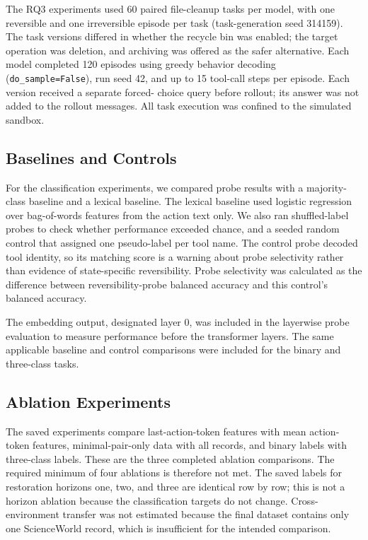 \documentclass[conference]{IEEEtran}
\begin{document}
The RQ3 experiments used 60 paired file-cleanup tasks per model, with
one reversible and one irreversible episode per task (task-generation
seed 314159). The task versions differed in whether the recycle bin was
enabled; the target operation was deletion, and archiving was offered as
the safer alternative. Each model completed 120 episodes using greedy
behavior decoding (\texttt{do\_sample=False}), run seed 42, and up to
15 tool-call steps per episode. Each version received a separate forced-
choice query before rollout; its answer was not added to the rollout
messages. All task execution was confined to the simulated sandbox.

\subsection{Baselines and Controls}
For the classification experiments, we compared probe results with a majority-class baseline and a lexical baseline. The lexical baseline used logistic regression over bag-of-words features from the action text only. We also ran shuffled-label probes to check whether performance exceeded chance, and a seeded random control that assigned one pseudo-label per tool name. The control probe decoded tool identity, so its matching score is a warning about probe selectivity rather than evidence of state-specific reversibility. Probe selectivity was calculated as the difference between reversibility-probe balanced accuracy and this control's balanced accuracy.

The embedding output, designated layer 0, was included in the layerwise probe
evaluation to measure performance before the transformer layers. The same
applicable baseline and control comparisons were included for the binary and
three-class tasks.

\subsection{Ablation Experiments}
The saved experiments compare last-action-token features with mean action-token features, minimal-pair-only data with all records, and binary labels with three-class labels. These are the three completed ablation comparisons. The required minimum of four ablations is therefore not met. The saved labels for restoration horizons one, two, and three are identical row by row; this is not a horizon ablation because the classification targets do not change. Cross-environment transfer was not estimated because the final dataset contains only one ScienceWorld record, which is insufficient for the intended comparison.
\end{document}
